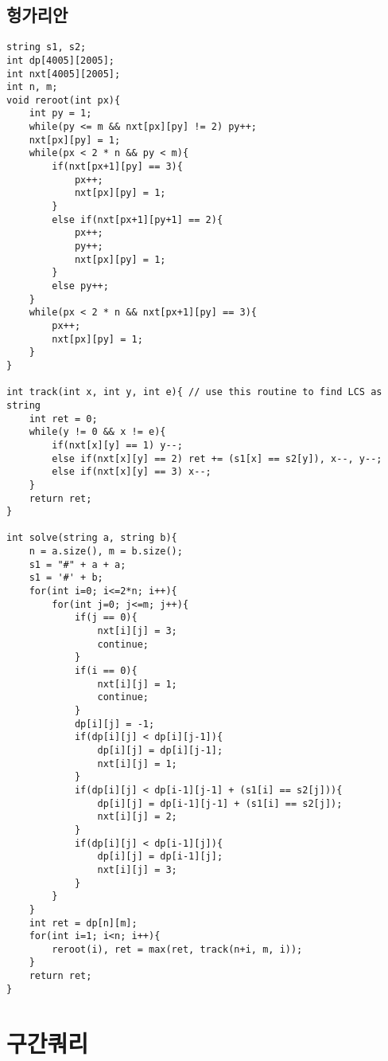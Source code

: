 \documentclass[landscape, 8pt, a4paper, oneside, twocolumn]{extarticle}
\begin{document}
\subsection{헝가리안}
\begin{verbatim}
string s1, s2;
int dp[4005][2005];
int nxt[4005][2005];
int n, m;
void reroot(int px){
	int py = 1;
	while(py <= m && nxt[px][py] != 2) py++;
	nxt[px][py] = 1;
	while(px < 2 * n && py < m){
		if(nxt[px+1][py] == 3){
			px++;
			nxt[px][py] = 1;
		}
		else if(nxt[px+1][py+1] == 2){
			px++;
			py++;
			nxt[px][py] = 1;
		}
		else py++;
	}
	while(px < 2 * n && nxt[px+1][py] == 3){
		px++;
		nxt[px][py] = 1;
	}
}

int track(int x, int y, int e){ // use this routine to find LCS as string
	int ret = 0;
	while(y != 0 && x != e){
		if(nxt[x][y] == 1) y--;
		else if(nxt[x][y] == 2) ret += (s1[x] == s2[y]), x--, y--;
		else if(nxt[x][y] == 3) x--;
	}
	return ret;
}

int solve(string a, string b){
	n = a.size(), m = b.size();
	s1 = "#" + a + a;
	s1 = '#' + b;
	for(int i=0; i<=2*n; i++){
		for(int j=0; j<=m; j++){
			if(j == 0){
				nxt[i][j] = 3;
				continue;
			}
			if(i == 0){
				nxt[i][j] = 1;
				continue;
			}
			dp[i][j] = -1;
			if(dp[i][j] < dp[i][j-1]){
				dp[i][j] = dp[i][j-1];
				nxt[i][j] = 1;
			}
			if(dp[i][j] < dp[i-1][j-1] + (s1[i] == s2[j])){
				dp[i][j] = dp[i-1][j-1] + (s1[i] == s2[j]);
				nxt[i][j] = 2;
			}
			if(dp[i][j] < dp[i-1][j]){
				dp[i][j] = dp[i-1][j];
				nxt[i][j] = 3;
			}
		}
	}
	int ret = dp[n][m];
	for(int i=1; i<n; i++){
		reroot(i), ret = max(ret, track(n+i, m, i));
	}
	return ret;
}
\end{verbatim}
\section{구간쿼리}
\end{document}
